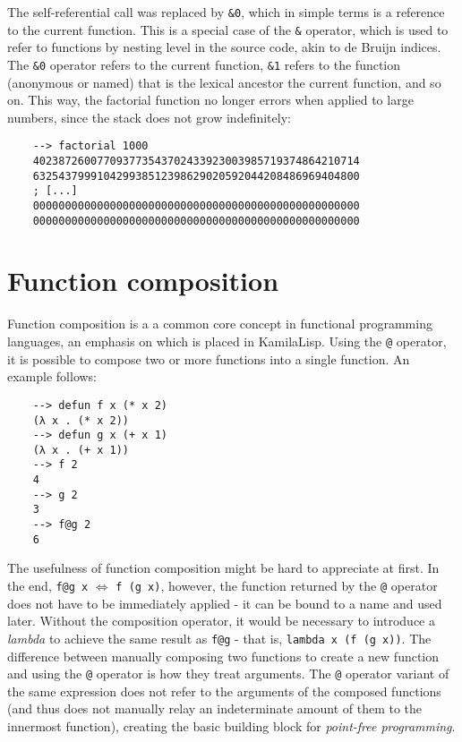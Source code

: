 The self-referential call was replaced by \verb|&0|, which in simple terms is a reference to the current function. This is a special case of the \verb|&| operator, which is used to refer to functions by nesting level in the source code, akin to de Bruijn indices. The \verb|&0| operator refers to the current function, \verb|&1| refers to the function (anonymous or named) that is the lexical ancestor the current function, and so on. This way, the factorial function no longer errors when applied to large numbers, since the stack does not grow indefinitely:

\begin{Verbatim}
    --> factorial 1000
    402387260077093773543702433923003985719374864210714
    632543799910429938512398629020592044208486969404800
    ; [...]
    000000000000000000000000000000000000000000000000000
    000000000000000000000000000000000000000000000000000
\end{Verbatim}

\section{Function composition}

Function composition is a a common core concept in functional programming languages, an emphasis on which is placed in KamilaLisp. Using the \verb|@| operator, it is possible to compose two or more functions into a single function. An example follows:

\begin{Verbatim}
    --> defun f x (* x 2)
    (λ x . (* x 2))
    --> defun g x (+ x 1)
    (λ x . (+ x 1))
    --> f 2
    4
    --> g 2
    3
    --> f@g 2
    6
\end{Verbatim}

The usefulness of function composition might be hard to appreciate at first. In the end, \verb|f@g x| $\Leftrightarrow$ \verb|f (g x)|, however, the function returned by the \verb|@| operator does not have to be immediately applied - it can be bound to a name and used later. Without the composition operator, it would be necessary to introduce a \textit{lambda} to achieve the same result as \verb|f@g| - that is, \verb|lambda x (f (g x))|. The difference between manually composing two functions to create a new function and using the \verb|@| operator is how they treat arguments. The \verb|@| operator variant of the same expression does not refer to the arguments of the composed functions (and thus does not manually relay an indeterminate amount of them to the innermost function), creating the basic building block for \textit{point-free programming}.

